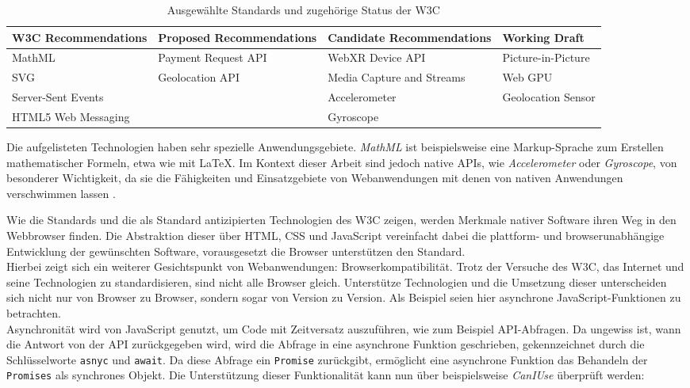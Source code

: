 \documentclass[a4paper]{scrartcl}
\begin{document}
\begin{table}[H]
	\centering
	\caption{Ausgewählte Standards und zugehörige Status der W3C}
	\begin{center}
		\begin{tabularx}{\linewidth}{| Y | Y | Y | Y |}
			\hline
			\textbf{W3C Recommendations} & \textbf{Proposed Recommendations} & \textbf{Candidate Recommendations} & \textbf{Working Draft} \\
			\hline \hline
			MathML & Payment Request API & WebXR Device API & Picture-in-Picture \\
			\hline
			SVG & Geolocation API & Media Capture and Streams & Web GPU \\
			\hline
			Server-Sent Events & & Accelerometer & Geolocation Sensor \\
			\hline
			HTML5 Web Messaging & & Gyroscope & \\
			\hline
		\end{tabularx}
	\end{center}	
	Die aufgelisteten Technologien haben sehr spezielle Anwendungsgebiete. \textit{MathML} ist beispielsweise eine Markup-Sprache zum Erstellen mathematischer Formeln, etwa wie mit \LaTeX. Im Kontext dieser Arbeit sind jedoch native APIs, wie \textit{Accelerometer} oder \textit{Gyroscope}, von besonderer Wichtigkeit, da sie die Fähigkeiten und Einsatzgebiete von Webanwendungen mit denen von nativen Anwendungen verschwimmen lassen \autocite{W3C}.
\end{table}

Wie die Standards und die als Standard antizipierten Technologien des W3C zeigen, werden Merkmale nativer Software ihren Weg in den Webbrowser finden. Die Abstraktion dieser über HTML, CSS und JavaScript vereinfacht dabei die plattform- und browserunabhängige Entwicklung der gewünschten Software, vorausgesetzt die Browser unterstützen den Standard. \\

Hierbei zeigt sich ein weiterer Gesichtspunkt von Webanwendungen: Browserkompatibilität. Trotz der Versuche des W3C, das Internet und seine Technologien zu standardisieren, sind nicht alle Browser gleich. Unterstütze Technologien und die Umsetzung dieser unterscheiden sich nicht nur von Browser zu Browser, sondern sogar von Version zu Version. Als Beispiel seien hier asynchrone JavaScript-Funktionen zu betrachten. \\
 Asynchronität wird von JavaScript genutzt, um Code mit Zeitversatz auszuführen, wie zum Beispiel API-Abfragen. Da ungewiss ist, wann die Antwort von der API zurückgegeben wird, wird die Abfrage in eine asynchrone Funktion geschrieben, gekennzeichnet durch die Schlüsselworte \texttt{asnyc} und \texttt{await}. Da diese Abfrage ein \texttt{Promise} zurückgibt, ermöglicht eine asynchrone Funktion das Behandeln der \texttt{Promises} als synchrones Objekt. Die Unterstützung dieser Funktionalität kann nun über beispielsweise \textit{CanIUse} überprüft werden: 
 
\end{document}
